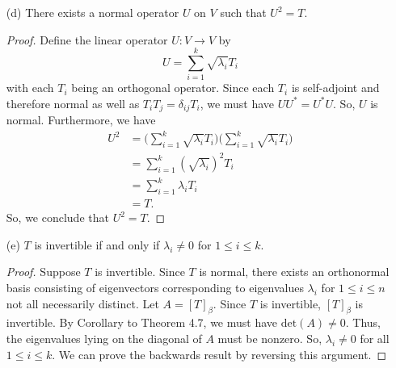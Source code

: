 \begin{enumerate}
        \begin{proof}
        Suppose \( U  \) commutes with \( T  \). Then we have \( UT = TU  \). Since 
        \[  T = {\lambda}_{1} {T}_{1} + {\lambda}_{2} {T}_{2} + \cdots + {\lambda}_{k} {T}_{k},  \]
        we have 
        \[  UT = U \Big( \sum_{ i = 1   }^{ k  } {\lambda}_{i} {T}_{i} \Big) = \sum_{ i=1  }^{ k  } {\lambda}_{i} U {T}_{i} \]
        and 
        \[  TU = \Big(  \sum_{ i=1  }^{ k  } {\lambda}_{i} {T}_{i} \Big) U = \sum_{ i=1  }^{ k  } {\lambda}_{i} {T}_{i} U.  \]
        Since \( TU = UT  \), \( U  \) must commute with every \( {T}_{i} \).

        On the other hand, suppose \( U  \) commutes with every \( {T}_{i} \).

        \end{proof}
    \item[(d)] There exists a normal operator \( U  \) on \( V  \) such that \( U^{2} = T  \).
        \begin{proof}
        Define the linear operator \( U: V \to V  \) by 
        \[  U = \sum_{ i=1  }^{ k  } \sqrt{ {\lambda}_{i} } {T}_{i} \]
        with each \( {T}_{i} \) being an orthogonal operator. Since each \( {T}_{i} \) is self-adjoint and therefore normal as well as \( {T}_{i} {T}_{j} = {\delta}_{ij} {T}_{i}  \), we must have \( U U^{*} = U^{*} U   \). So, \( U  \) is normal. Furthermore, we have  
        \begin{align*}
            U^{2} &= \Big(  \sum_{ i=1  }^{ k  } \sqrt{ {\lambda}_{i} }  {T}_{i} \Big) \Big(  \sum_{ i=1  }^{ k  } \sqrt{ {\lambda}_{i} }  {T}_{i} \Big) \\
                  &= \sum_{ i=1  }^{ k  } (\sqrt{ {\lambda}_{i} } )^{2} {T}_{i} \\  
                  &=\sum_{ i=1  }^{ k  } {\lambda}_{i} {T}_{i} \\
                  &= T.
        \end{align*}
        So, we conclude that \( U^{2} = T  \).
        \end{proof}
    \item[(e)] \( T  \) is invertible if and only if \( {\lambda}_{i} \neq 0  \) for \( 1 \leq i \leq k  \).
        \begin{proof}
        Suppose \( T  \) is invertible. Since \( T  \) is normal, there exists an orthonormal basis consisting of eigenvectors corresponding to eigenvalues \( {\lambda}_{i}    \) for \( 1 \leq i \leq n  \) not all necessarily distinct. Let \( A = [T]_{\beta} \). Since \( T \) is invertible, \( [T]_{\beta}  \) is invertible. By Corollary to Theorem 4.7, we must have \( \text{det}(A) \neq  0  \). Thus, the eigenvalues lying on the diagonal of \( A  \) must be nonzero. So, \( {\lambda}_{i} \neq 0  \) for all \( 1 \leq i \leq k  \). We can prove the backwards result by reversing this argument.

\end{proof}
\end{enumerate}
